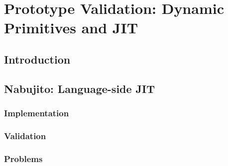 

\chapter{Prototype Validation: Dynamic Primitives and JIT}
\minitoc


\section{Introduction}

\section{Nabujito: Language-side JIT}

\subsection{Implementation}

\subsection{Validation}

\subsection{Problems}

